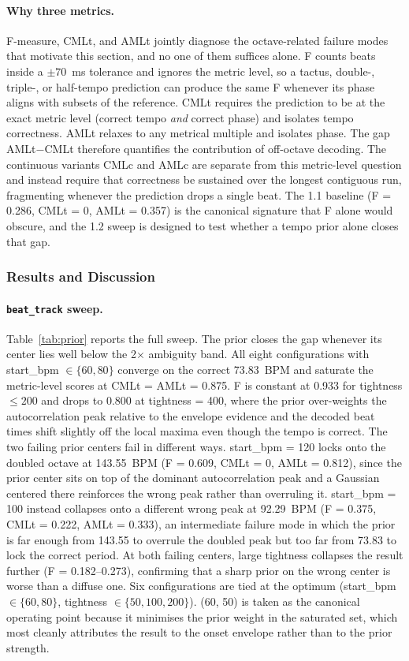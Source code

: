 \documentclass{article}
\begin{document}
\paragraph{Why three metrics.} F-measure, CMLt, and AMLt jointly diagnose the octave-related failure modes that motivate this section, and no one of them suffices alone. F counts beats inside a $\pm 70$~ms tolerance and ignores the metric level, so a tactus, double-, triple-, or half-tempo prediction can produce the same F whenever its phase aligns with subsets of the reference. CMLt requires the prediction to be at the exact metric level (correct tempo \emph{and} correct phase) and isolates tempo correctness. AMLt relaxes to any metrical multiple and isolates phase. The gap AMLt$-$CMLt therefore quantifies the contribution of off-octave decoding. The continuous variants CMLc and AMLc are separate from this metric-level question and instead require that correctness be sustained over the longest contiguous run, fragmenting whenever the prediction drops a single beat. The 1.1 baseline (F = 0.286, CMLt = 0, AMLt = 0.357) is the canonical signature that F alone would obscure, and the 1.2 sweep is designed to test whether a tempo prior alone closes that gap.

\subsubsection{Results and Discussion}

\paragraph{\texttt{beat\_track} sweep.} Table~\ref{tab:prior} reports the full sweep. The prior closes the gap whenever its center lies well below the 2$\times$ ambiguity band. All eight configurations with start\_bpm $\in \{60, 80\}$ converge on the correct 73.83~BPM and saturate the metric-level scores at CMLt = AMLt = 0.875. F is constant at 0.933 for tightness $\le 200$ and drops to 0.800 at tightness = 400, where the prior over-weights the autocorrelation peak relative to the envelope evidence and the decoded beat times shift slightly off the local maxima even though the tempo is correct. The two failing prior centers fail in different ways. start\_bpm = 120 locks onto the doubled octave at 143.55~BPM (F = 0.609, CMLt = 0, AMLt = 0.812), since the prior center sits on top of the dominant autocorrelation peak and a Gaussian centered there reinforces the wrong peak rather than overruling it. start\_bpm = 100 instead collapses onto a different wrong peak at 92.29~BPM (F = 0.375, CMLt = 0.222, AMLt = 0.333), an intermediate failure mode in which the prior is far enough from 143.55 to overrule the doubled peak but too far from 73.83 to lock the correct period. At both failing centers, large tightness collapses the result further (F = 0.182--0.273), confirming that a sharp prior on the wrong center is worse than a diffuse one. Six configurations are tied at the optimum (start\_bpm $\in \{60, 80\}$, tightness $\in \{50, 100, 200\}$). (60, 50) is taken as the canonical operating point because it minimises the prior weight in the saturated set, which most cleanly attributes the result to the onset envelope rather than to the prior strength.
\end{document}
